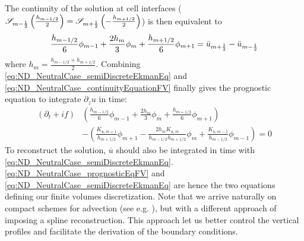 The continuity of the solution at cell interfaces (${\cal S}_{m-\frac{1}{2}}\left(\frac{h_{m-1/2}}{2}\right) = {\cal S}_{m+\frac{1}{2}}\left(-\frac{h_{m+1/2}}{2}\right)$) is then equivalent to
%
\begin{equation}
\label{eq:ND_NeutralCase_continuityEquationFV}
\frac{h_{m-1/2}}{6} \phi_{m-1} 
+ \frac{2h_{m}}{3} \phi_m  
+ \frac{h_{m+1/2}}{6} \phi_{m+1} = \Bar{u}_{m+\frac{1}{2}} - \Bar{u}_{m-\frac{1}{2}}
\end{equation}
where $h_m = \frac{h_{m-1/2} + h_{m+1/2}}{2}$.
Combining \eqref{eq:ND_NeutralCase_semiDiscreteEkmanEq}
and \eqref{eq:ND_NeutralCase_continuityEquationFV} finally gives
the prognostic equation to integrate
$\partial_z u$ in time:
\begin{equation}
\begin{aligned}
\label{eq:ND_NeutralCase_prognosticEqFV}
(\partial_t + if) &\left( \frac{h_{m-1/2}}{6} \phi_{m-1} 
+ \frac{2h_m}{3} \phi_m  
+ \frac{h_{m+1/2}}{6} \phi_{m+1} \right) \\
	&-
    \left(
	\frac{K_{u, m+1}}{ h_{m+1/2}}\phi_{m+1} -
	\frac{2 h_m K_{u,m}}{h_{m-1/2} h _{m+1/2}}\phi_m +
	\frac{K_{u,m-1}}{h_{m-1/2}}\phi_{m-1}
    \right)
= 0
\end{aligned}
\end{equation}
To reconstruct the solution, $\overline{u}$ should also be 
integrated in time with \eqref{eq:ND_NeutralCase_semiDiscreteEkmanEq}.
\eqref{eq:ND_NeutralCase_prognosticEqFV} and
\eqref{eq:ND_NeutralCase_semiDiscreteEkmanEq} are hence the two 
equations defining our finite volumes discretization.
Note that we arrive naturally on compact schemes for advection
(see e.g. \cite{piller_finite-volume_2004}), but with a different
approach of imposing a spline reconstruction. This approach
let us better control the vertical profiles and
facilitate the derivation of the boundary conditions.
